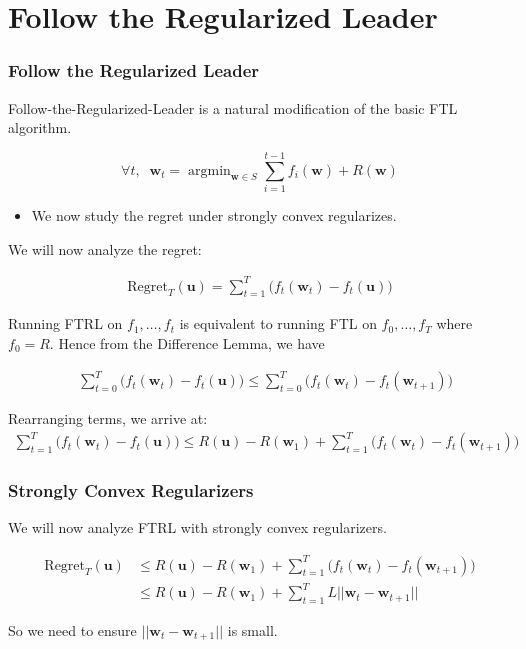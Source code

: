 \documentclass{beamer}
\DeclareMathOperator*{\argmin}{argmin}
\newcommand{\uu}{\mathbf{u}}
\newcommand{\w}{\mathbf{w}}
\begin{document}
\section{Follow the Regularized Leader}
\frame{\sectionpage}
\begin{frame}
\frametitle{Follow the Regularized Leader}
Follow-the-Regularized-Leader is a natural modification of the basic FTL algorithm.

\begin{equation*}
\forall t, \;\; \w_t = \argmin_{\w \in S} \sum_{i = 1}^{t-1} f_i(\w) + R(\w)
\end{equation*}

\begin{itemize}
\item We now study the regret under strongly convex regularizes.

\end{itemize}
\end{frame}

\begin{frame}
We will now analyze the regret:

\begin{align*}
\mathrm{Regret}_T(\uu) = \sum_{t = 1}^{T} \Big(f_t(\w_t) - f_t(\uu)\Big)
\end{align*}

Running FTRL on $f_1, \dots, f_t$ is equivalent to running FTL on $f_0, \dots, f_T$ where $f_0 = R$. Hence from the Difference Lemma, we have

\begin{align*}
&\sum_{t = 0}^{T} \Big(f_t(\w_t) - f_t({\uu})\Big) \leq \sum_{t = 0}^{T}\Big( f_t(\w_t) - f_t(\w_{t+1})\Big)
\end{align*}
\pause

Rearranging terms, we arrive at:
\begin{align*}
\sum_{t = 1}^{T} \Big(f_t(\w_t) - f_t({\uu})\Big) \leq R(\uu) - R(\w_1) + \sum_{t = 1}^{T}\Big( f_t(\w_t) - f_t(\w_{t+1})\Big)
\end{align*}
\end{frame}



\begin{frame}
\frametitle{Strongly Convex Regularizers}

We will now analyze FTRL with strongly convex regularizers.

\begin{align*}
\mathrm{Regret}_T(\uu) &\leq R(\uu) - R(\w_1) + \sum_{t = 1}^{T}\Big( f_t(\w_t) - f_t(\w_{t+1})\Big)\\
&\leq R(\uu) - R(\w_1) + \sum_{t = 1}^{T}L ||\w_t - \w_{t+1}||
\end{align*}

So we need to ensure $||\w_t - \w_{t+1}||$ is small.
\end{frame}
\end{document}
